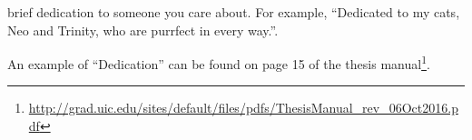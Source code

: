 \dedication

A brief dedication to someone you care about.  For example, ``Dedicated to
my cats, Neo and Trinity, who are purrfect in every way.''.

An example of ``Dedication'' can be found on page 15 of the thesis
manual\footnote{\url{http://grad.uic.edu/sites/default/files/pdfs/ThesisManual_rev_06Oct2016.pdf}}.